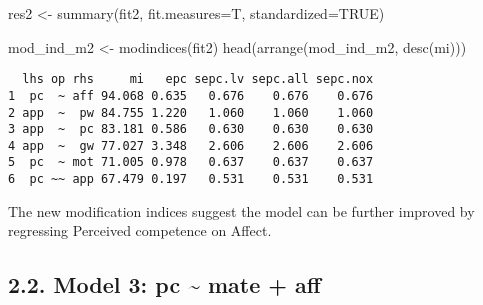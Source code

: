 \documentclass[
  letterpaper,
  DIV=11,
  numbers=noendperiod]{scrartcl}
\newenvironment{Shaded}{\begin{snugshade}}{\end{snugshade}}
\newcommand{\AttributeTok}[1]{\textcolor[rgb]{0.40,0.45,0.13}{#1}}
\newcommand{\ConstantTok}[1]{\textcolor[rgb]{0.56,0.35,0.01}{#1}}
\newcommand{\FunctionTok}[1]{\textcolor[rgb]{0.28,0.35,0.67}{#1}}
\newcommand{\NormalTok}[1]{\textcolor[rgb]{0.00,0.23,0.31}{#1}}
\newcommand{\OtherTok}[1]{\textcolor[rgb]{0.00,0.23,0.31}{#1}}
\begin{document}
\begin{Shaded}
\begin{Highlighting}[]
\NormalTok{res2 }\OtherTok{\textless{}{-}} \FunctionTok{summary}\NormalTok{(fit2, }\AttributeTok{fit.measures=}\NormalTok{T, }\AttributeTok{standardized=}\ConstantTok{TRUE}\NormalTok{)}

\NormalTok{mod\_ind\_m2 }\OtherTok{\textless{}{-}} \FunctionTok{modindices}\NormalTok{(fit2)}
\FunctionTok{head}\NormalTok{(}\FunctionTok{arrange}\NormalTok{(mod\_ind\_m2, }\FunctionTok{desc}\NormalTok{(mi)))}
\end{Highlighting}
\end{Shaded}

\begin{verbatim}
  lhs op rhs     mi   epc sepc.lv sepc.all sepc.nox
1  pc  ~ aff 94.068 0.635   0.676    0.676    0.676
2 app  ~  pw 84.755 1.220   1.060    1.060    1.060
3 app  ~  pc 83.181 0.586   0.630    0.630    0.630
4 app  ~  gw 77.027 3.348   2.606    2.606    2.606
5  pc  ~ mot 71.005 0.978   0.637    0.637    0.637
6  pc ~~ app 67.479 0.197   0.531    0.531    0.531
\end{verbatim}

The new modification indices suggest the model can be further improved
by regressing Perceived competence on Affect.

\subsection{2.2. Model 3: pc \textasciitilde{} mate +
aff}\label{model-3-pc-mate-aff}
\end{document}
